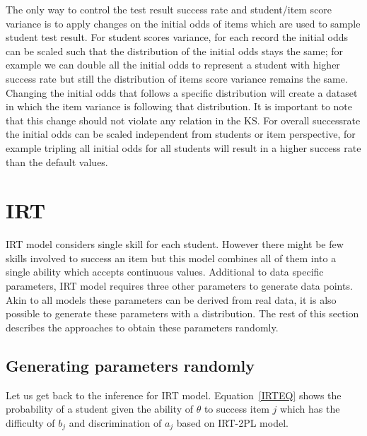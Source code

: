 The only way to control the test result success rate and student/item score variance is to apply changes on the initial odds of items which are used to sample student test result. For student scores variance, for each record the initial odds can be scaled such that the distribution of the initial odds stays the same; for example we can double all the initial odds to represent a student with higher success rate but still the distribution of items score variance remains the same. Changing the initial odds that follows a specific distribution will create a dataset in which the item variance is following that distribution. It is important to note that this change should not violate any relation in the KS. For overall successrate the initial odds can be scaled independent from students or item perspective, for example tripling all initial odds for all students will result in a higher success rate than the default values.





\section{IRT}

IRT model considers single skill for each student. However there might be few skills involved to success an item but this model combines all of them into a single ability which accepts continuous values. Additional to data specific parameters, IRT model requires three other parameters to generate data points. Akin to all models these parameters can be derived from real data, it is also possible to generate these parameters with a distribution. The rest of this section describes the approaches to obtain these parameters randomly.

\subsection{Generating parameters randomly}
Let us get back to the inference for IRT model. Equation~\ref{IRTEQ} shows the probability of a student given the ability of $\theta$ to success item $j$ which has the difficulty of $b_j$ and discrimination of $a_j$ based on IRT-2PL model. 


